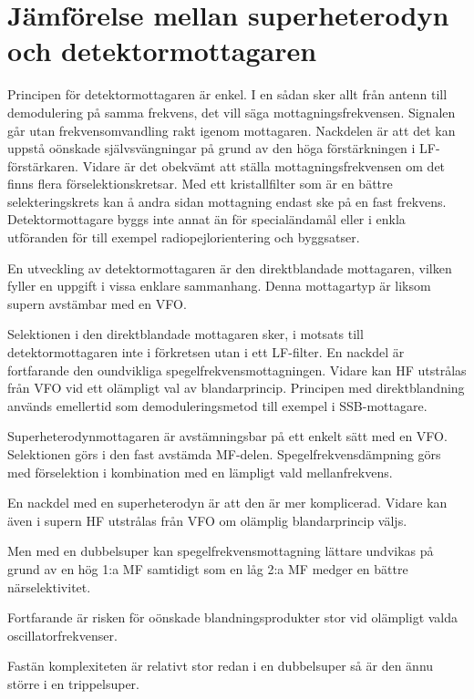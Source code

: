 \section[Jämförelse superheterodyn]{Jämförelse mellan superheterodyn och detektormottagaren}
\label{superheterojämförelse}

Principen för detektormottagaren är enkel.
I en sådan sker allt från antenn till demodulering på samma frekvens,
det vill säga mottagningsfrekvensen.
Signalen går utan frekvensomvandling rakt igenom mottagaren.
Nackdelen är att det kan uppstå oönskade självsvängningar på grund av den
höga förstärkningen i LF-förstärkaren.
Vidare är det obekvämt att ställa mottagningsfrekvensen om det finns flera
förselektionskretsar.
Med ett kristallfilter som är en bättre selekteringskrets kan å andra sidan
mottagning endast ske på en fast frekvens.
Detektormottagare byggs inte annat än för specialändamål eller i enkla
utföranden för till exempel radiopejlorientering och byggsatser.

En utveckling av detektormottagaren är den direktblandade mottagaren,
vilken fyller en uppgift i vissa enklare sammanhang.
Denna mottagartyp är liksom supern avstämbar med en VFO.

Selektionen i den direktblandade mottagaren sker, i motsats till
detektormottagaren inte i förkretsen utan i ett LF-filter.
En nackdel är fortfarande den oundvikliga spegelfrekvensmottagningen.
Vidare kan HF utstrålas från VFO vid ett olämpligt val av blandarprincip.
Principen med direktblandning används emellertid som demoduleringsmetod till
exempel i SSB-mottagare.

Superheterodynmottagaren är avstämningsbar på ett enkelt sätt med en VFO.
Selektionen görs i den fast avstämda MF-delen.
Spegelfrekvensdämpning görs med förselektion i kombination med en lämpligt
vald mellanfrekvens.

En nackdel med en superheterodyn är att den är mer komplicerad.
Vidare kan även i supern HF utstrålas från VFO om olämplig blandarprincip väljs.

Men med en dubbelsuper kan spegelfrekvensmottagning lättare undvikas på grund
av en hög 1:a MF samtidigt som en låg 2:a MF medger en bättre närselektivitet.

Fortfarande är risken för oönskade blandningsprodukter stor vid
olämpligt valda oscillatorfrekvenser.

Fastän komplexiteten är relativt stor redan i en dubbelsuper så är den
ännu större i en trippelsuper.

